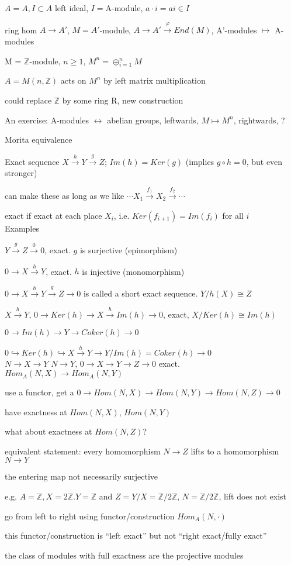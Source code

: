 \documentclass[12pt]{article}
\begin{document}
\noindent
$A = A, I \subset A$ left ideal, $I = $A-module, $a \cdot i = ai \in I$

\noindent
ring hom $A \to A'$, $M = A'$-module, $A \to A' \xrightarrow{\varphi} End(M)$, A'-modules $\mapsto$ A-modules

\noindent
M = $\mathds{Z}$-module, $n \geq 1$, $M^n = \oplus_{i = 1}^n M$

$A = M(n, \mathds{Z})$ acts on $M^n$ by left matrix multiplication

could replace $\mathds{Z}$ by some ring R, new construction

An exercise: A-modules $\leftrightarrow$ abelian groups, leftwards, $M \mapsto M^n$, rightwards, ?

Morita equivalence

\noindent
Exact sequence $X \xrightarrow{h} Y \xrightarrow{g} Z$; $Im(h) = Ker(g)$ (implies $g \circ h = 0$, but even stronger)

can make these as long as we like $\cdots X_1 \xrightarrow{f_1} X_2 \xrightarrow{f_2} \cdots$

exact if exact at each place $X_i$, i.e. $Ker(f_{i + 1}) = Im(f_i)$ for all $i$\\

\noindent
Examples

\noindent
$Y \xrightarrow{g} Z \xrightarrow{0} 0$, exact.  $g$ is surjective (epimorphism)

\noindent
$0 \to X \xrightarrow{h} Y$, exact.  $h$ is injective (monomorphism)

\noindent
$0 \to X \xrightarrow{h} Y \xrightarrow{g} Z \to 0$ is called a short exact sequence.  $Y/h(X) \cong Z$

\noindent
$X \xrightarrow{h} Y$, $0 \to Ker(h) \to X \xrightarrow{h} Im(h) \to 0$, exact, $X/Ker(h) \cong Im(h)$

\noindent
$0 \to Im(h) \to Y \to Coker(h) \to 0$

\noindent
$0 \hookrightarrow Ker(h) \hookrightarrow X \xrightarrow{h} Y \to Y/Im(h) = Coker(h) \to 0$\\

\noindent
$N \to X \to Y$ $N \to Y$, $0 \to X \to Y \to Z \to 0$ exact.  $Hom_A(N, X) \to Hom_A(N, Y)$

use a functor, get a $0 \to Hom(N, X) \to Hom(N, Y) \to Hom(N, Z) \to 0$

have exactness at $Hom(N, X)$, $Hom(N, Y)$

what about exactness at $Hom(N, Z)$?

equivalent statement: every homomorphism $N \to Z$ lifts to a homomorphism $N \to Y$

the entering map not necessarily surjective

e.g. $A = \mathds{Z}, X = 2\mathds{Z}. Y = \mathds{Z}$ and $Z = Y/X = \mathds{Z}/2\mathds{Z}$, $N = \mathds{Z}/2\mathds{Z}$, lift does not exist

go from left to right using functor/construction $Hom_A(N, \cdot)$

this functor/construction is ``left exact'' but not ``right exact/fully exact''

the class of modules with full exactness are the projective modules
\end{document}
